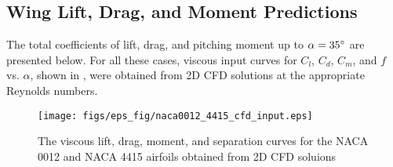 \subsection{Wing Lift, Drag, and Moment Predictions}
\label{sec:total-loads}

The total coefficients of lift, drag, and pitching moment  up to $\alpha=35^\circ{}$ are presented below. For all these cases, viscous input curves for $C_l$, $C_d$, $C_m$, and $f$ vs. $\alpha$, shown in , were obtained from 2D CFD solutions at the appropriate Reynolds numbers.

\begin{figure}[!h]
    \centering
    \texttt{[image: figs/eps\_fig/naca0012\_4415\_cfd\_input.eps]}
    \caption{The viscous lift, drag, moment, and separation curves for the NACA 0012 and NACA 4415 airfoils obtained from 2D CFD soluions}
    \label{fig:cfd-coeffs}
\end{figure}











